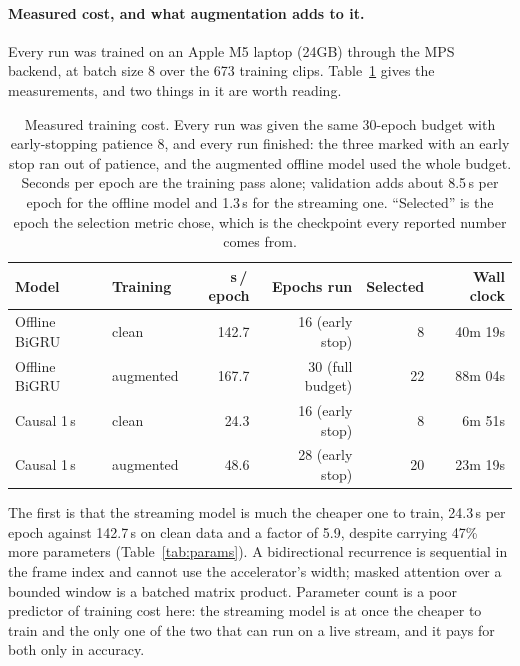 \documentclass{article}
\begin{document}
\paragraph{Measured cost, and what augmentation adds to it.} Every run was trained on an
Apple M5 laptop (24GB) through the MPS backend, at batch size 8 over the 673 training
clips. Table~\ref{tab:cost} gives the measurements, and two things in it are worth
reading.

\begin{table}[H]
    \centering
    \caption{Measured training cost. Every run was given the same 30-epoch budget with
    early-stopping patience 8, and every run finished: the three marked with an early stop
    ran out of patience, and the augmented offline model used the whole budget. Seconds per
    epoch are the training pass alone; validation adds about 8.5\,s per epoch for the
    offline model and 1.3\,s for the streaming one. ``Selected'' is the epoch the selection
    metric chose, which is the checkpoint every reported number comes from.}
    \label{tab:cost}
    \setlength{\tabcolsep}{5pt}
    \small
    \begin{tabular}{llrrrr}
        \toprule
        Model & Training & s\,/\,epoch & Epochs run & Selected & Wall clock \\
        \midrule
        Offline BiGRU & clean     & 142.7 & 16 (early stop) & 8  & 40m 19s \\
        Offline BiGRU & augmented & 167.7 & 30 (full budget) & 22 & 88m 04s \\
        Causal 1\,s   & clean     & 24.3  & 16 (early stop) & 8  & 6m 51s \\
        Causal 1\,s   & augmented & 48.6  & 28 (early stop) & 20 & 23m 19s \\
        \bottomrule
    \end{tabular}
\end{table}

The first is that the streaming model is much the cheaper one to train, 24.3\,s per epoch against 142.7\,s on clean data and a factor of 5.9, despite carrying 47\% more
parameters (Table~\ref{tab:params}). A bidirectional recurrence is sequential in the
frame index and cannot use the accelerator's width; masked attention over a bounded
window is a batched matrix product. Parameter count is a poor predictor of training cost
here: the streaming model is at once the cheaper to train and the only one of the two
that can run on a live stream, and it pays for both only in accuracy.
\end{document}
